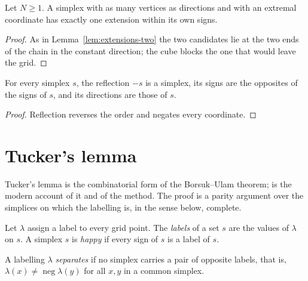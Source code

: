\begin{lemma}
\label{lem:extensions-one-extremal}
\leanok
{}
Let $N \ge 1$. A simplex with as many vertices as directions and with an extremal
coordinate has exactly one extension within its own signs.
\end{lemma}
\begin{proof}
\leanok
{}
As in Lemma~\ref{lem:extensions-two} the two candidates lie at the two ends of the
chain in the constant direction; the cube blocks the one that would leave the grid.
\end{proof}

\begin{lemma}[Reflection]
\label{lem:simplex-neg}
\leanok
{}
For every simplex $s$, the reflection $-s$ is a simplex, its signs are the opposites of
the signs of $s$, and its directions are those of $s$.
\end{lemma}
\begin{proof}
\leanok
Reflection reverses the order and negates every coordinate.
\end{proof}

\chapter{Tucker's lemma}
\label{ch:tucker}

Tucker's lemma \cite{Tucker46} is the combinatorial form of the Borsuk--Ulam theorem;
\cite{Mat} is the modern account of it and of the method. The proof is a parity
argument over the simplices on which the labelling is, in the sense below, complete.

\begin{definition}
\label{def:happy}
\leanok
{}
Let $\lambda$ assign a label to every grid point. The \emph{labels} of a set $s$ are
the values of $\lambda$ on $s$. A simplex $s$ is \emph{happy} if every sign of $s$ is a
label of $s$.
\end{definition}

\begin{definition}
\label{def:separates}
\leanok
{}
A labelling $\lambda$ \emph{separates} if no simplex carries a pair of opposite labels,
that is, $\lambda(x) \neq \operatorname{neg} \lambda(y)$ for all $x, y$ in a common
simplex.
\end{definition}

